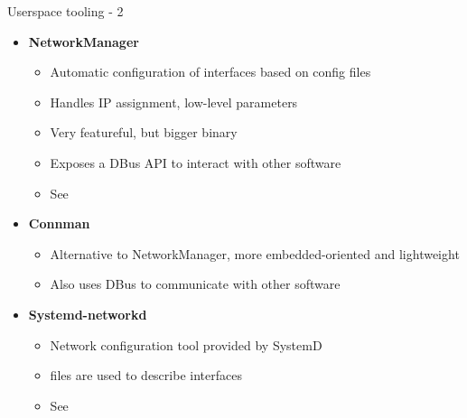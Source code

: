 \begin{frame}{Userspace tooling - 2}
	\begin{itemize}
		\item \textbf{NetworkManager}
			\begin{itemize}
				\item Automatic configuration of interfaces based on config files
				\item Handles IP assignment, low-level parameters
				\item Very featureful, but bigger binary
				\item Exposes a DBus API to interact with other software
				\item See 
			\end{itemize}
		\item \textbf{Connman}
			\begin{itemize}
				\item Alternative to NetworkManager, more embedded-oriented and lightweight
				\item Also uses DBus to communicate with other software
			\end{itemize}
		\item \textbf{Systemd-networkd}
			\begin{itemize}
				\item Network configuration tool provided by SystemD 
				\item {} files are used to describe interfaces
				\item See 
			\end{itemize}
		\end{itemize}
\end{frame}

